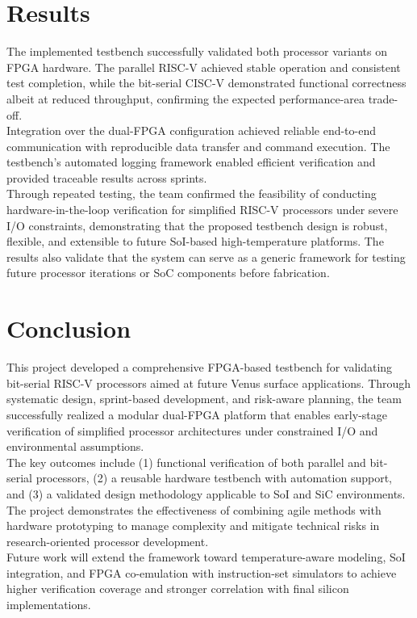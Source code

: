 \documentclass[10pt,twocolumn]{article}
\begin{document}
\section{Results}
The implemented testbench successfully validated both processor variants on FPGA hardware. The parallel RISC-V achieved stable operation and consistent test completion, while the bit-serial CISC-V demonstrated functional correctness albeit at reduced throughput, confirming the expected performance-area trade-off.\\
Integration over the dual-FPGA configuration achieved reliable end-to-end communication with reproducible data transfer and command execution. The testbench’s automated logging framework enabled efficient verification and provided traceable results across sprints.\\
Through repeated testing, the team confirmed the feasibility of conducting hardware-in-the-loop verification for simplified RISC-V processors under severe I/O constraints, demonstrating that the proposed testbench design is robust, flexible, and extensible to future SoI-based high-temperature platforms. The results also validate that the system can serve as a generic framework for testing future processor iterations or SoC components before fabrication.

\section{Conclusion}
This project developed a comprehensive FPGA-based testbench for validating bit-serial RISC-V processors aimed at future Venus surface applications. Through systematic design, sprint-based development, and risk-aware planning, the team successfully realized a modular dual-FPGA platform that enables early-stage verification of simplified processor architectures under constrained I/O and environmental assumptions.\\
The key outcomes include (1) functional verification of both parallel and bit-serial processors, (2) a reusable hardware testbench with automation support, and (3) a validated design methodology applicable to SoI and SiC environments. The project demonstrates the effectiveness of combining agile methods with hardware prototyping to manage complexity and mitigate technical risks in research-oriented processor development.\\
Future work will extend the framework toward temperature-aware modeling, SoI integration, and FPGA co-emulation with instruction-set simulators to achieve higher verification coverage and stronger correlation with final silicon implementations.



\end{document}
